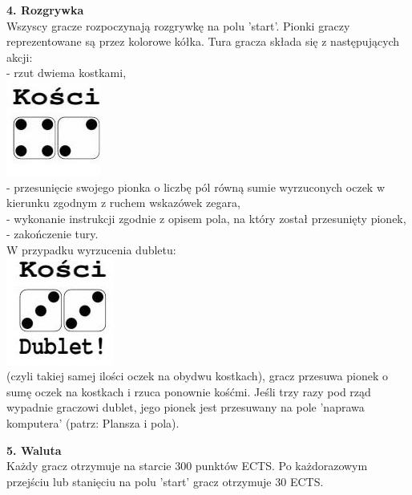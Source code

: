 \documentclass[a4paper]{article}
\begin{document}
\noindent \textbf{4. Rozgrywka}\\
\noindent Wszyscy gracze rozpoczynają rozgrywkę na polu 'start'. Pionki graczy reprezentowane są przez kolorowe kółka. Tura gracza składa się z następujących akcji:\\
- rzut dwiema kostkami,\\
\indent \includegraphics [scale=0.4]{kostki.png}\\
- przesunięcie swojego pionka o liczbę pól równą sumie wyrzuconych oczek w kierunku zgodnym z ruchem wskazówek zegara,\\
- wykonanie instrukcji zgodnie z opisem pola, na który został przesunięty pionek,\\
- zakończenie tury.\\
W przypadku wyrzucenia dubletu:\\
\indent \includegraphics[scale=0.4]{dublet.png}\\
(czyli takiej samej ilości oczek na obydwu kostkach), gracz przesuwa pionek o sumę oczek na kostkach i rzuca ponownie kośćmi. Jeśli trzy razy pod rząd wypadnie graczowi dublet, jego pionek jest przesuwany na pole 'naprawa komputera' (patrz: Plansza i pola). 
\vspace{10pt}

\noindent \textbf{5. Waluta}\\
\noindent Każdy gracz otrzymuje na starcie 300 punktów ECTS. Po każdorazowym przejściu lub stanięciu na polu 'start' gracz otrzymuje 30 ECTS.
\vspace{10pt}
\end{document}
